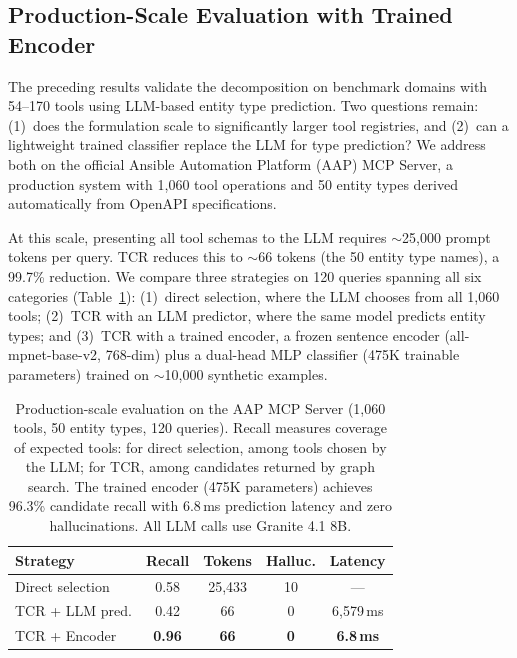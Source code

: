 \subsection{Production-Scale Evaluation with Trained Encoder}
\label{sec:production-eval}

The preceding results validate the decomposition on benchmark domains with 54--170 tools using LLM-based entity type prediction.
Two questions remain: (1)~does the formulation scale to significantly larger tool registries, and (2)~can a lightweight trained classifier replace the LLM for type prediction?
We address both on the official Ansible Automation Platform (AAP) MCP Server, a production system with 1,060 tool operations and 50 entity types derived automatically from OpenAPI specifications.

At this scale, presenting all tool schemas to the LLM requires ${\sim}$25,000 prompt tokens per query.
TCR reduces this to ${\sim}$66 tokens (the 50 entity type names), a 99.7\% reduction.
We compare three strategies on 120 queries spanning all six categories (Table~\ref{tab:aap-encoder}):
(1)~direct selection, where the LLM chooses from all 1,060 tools;
(2)~TCR with an LLM predictor, where the same model predicts entity types;
and (3)~TCR with a trained encoder, a frozen sentence encoder (all-mpnet-base-v2, 768-dim) plus a dual-head MLP classifier (475K trainable parameters) trained on ${\sim}$10,000 synthetic examples.

\begin{table}[t]
\centering
\small
\begin{tabular}{l cccc}
\toprule
\textbf{Strategy} & \textbf{Recall} & \textbf{Tokens} & \textbf{Halluc.} & \textbf{Latency} \\
\midrule
Direct selection       & 0.58         & 25,433         & 10 & ---           \\
TCR + LLM pred.        & 0.42         & 66             & 0  & 6,579\,ms    \\
TCR + Encoder          & \textbf{0.96} & \textbf{66}   & \textbf{0} & \textbf{6.8\,ms} \\
\bottomrule
\end{tabular}
\caption{Production-scale evaluation on the AAP MCP Server (1,060 tools, 50 entity types, 120 queries). Recall measures coverage of expected tools: for direct selection, among tools chosen by the LLM; for TCR, among candidates returned by graph search. The trained encoder (475K parameters) achieves 96.3\% candidate recall with 6.8\,ms prediction latency and zero hallucinations. All LLM calls use Granite 4.1 8B.}
\label{tab:aap-encoder}
\end{table}

